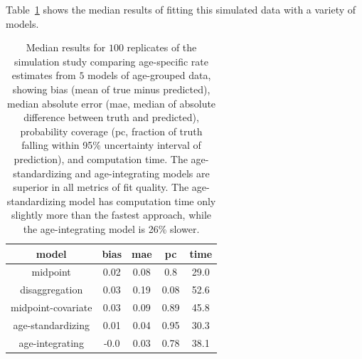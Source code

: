 Table~\ref{age_group_comparison} shows the median results of fitting this simulated data with a variety of models.

\begin{table}

\begin{center}
\begin{tabular}{|c|c|c|c|c|}
\hline
model&bias&mae&pc&time\\
\hline
midpoint&0.02&0.08&0.8&29.0\\
disaggregation&0.03&0.19&0.08&52.6\\
midpoint-covariate&0.03&0.09&0.89&45.8\\
age-standardizing&0.01&0.04&0.95&30.3\\
age-integrating&-0.0&0.03&0.78&38.1\\
\hline
\end{tabular}
\end{center}

\caption{Median results for $100$ replicates of the simulation study
  comparing age-specific rate estimates from $5$ models of age-grouped
  data, showing bias (mean of true minus predicted), median absolute
  error (mae, median of absolute difference between truth and
  predicted), probability coverage (pc, fraction of truth falling
  within 95\% uncertainty interval of prediction), and computation time. The
  age-standardizing and age-integrating models are superior in all
  metrics of fit quality.  The age-standardizing model has computation time only slightly more
  than the fastest approach, while the age-integrating model is 26\% slower.}
\label{age_group_comparison}
\end{table}
